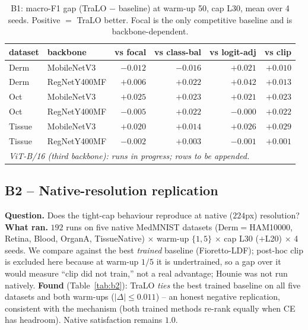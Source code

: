 \documentclass[11pt,a4paper]{article}
\begin{document}
\begin{table}[h]\centering\small
\begin{tabular}{llrrrr}
\toprule
dataset & backbone & vs focal & vs class-bal & vs logit-adj & vs clip \\
\midrule
Derm   & MobileNetV3 & $-0.012$ & $-0.016$ & $+0.021$ & $+0.010$ \\
Derm   & RegNetY400MF & $+0.006$ & $+0.022$ & $+0.042$ & $+0.013$ \\
Oct    & MobileNetV3 & $+0.025$ & $+0.023$ & $+0.021$ & $+0.023$ \\
Oct    & RegNetY400MF & $-0.005$ & $+0.022$ & $-0.000$ & $+0.022$ \\
Tissue & MobileNetV3 & $+0.020$ & $+0.014$ & $+0.026$ & $+0.029$ \\
Tissue & RegNetY400MF & $-0.002$ & $+0.003$ & $-0.001$ & $+0.001$ \\
\midrule
\multicolumn{6}{l}{\itshape ViT-B/16 (third backbone): runs in progress; rows to be appended.} \\
\bottomrule
\end{tabular}
\caption{B1: macro-F1 gap (TraLO $-$ baseline) at warm-up 50, cap L30, mean over 4 seeds. Positive $=$ TraLO
better. Focal is the only competitive baseline and is backbone-dependent.}
\label{tab:b1}
\end{table}

\subsection{B2 -- Native-resolution replication}
\textbf{Question.} Does the tight-cap behaviour reproduce at native ($224$px) resolution? \textbf{What ran.}
$192$ runs on five native MedMNIST datasets (Derm$=$HAM10000, Retina, Blood, OrganA, TissueNative) $\times$
warm-up $\{1,5\}$ $\times$ cap L30 ($+$L20) $\times$ 4 seeds. We compare against the best \emph{trained}
baseline (Fioretto-LDF); post-hoc clip is excluded here because at warm-up $1/5$ it is undertrained, so a gap
over it would measure ``clip did not train,'' not a real advantage; Hounie was not run natively.
\textbf{Found} (Table~\ref{tab:b2}): TraLO \emph{ties} the best trained baseline on all five datasets and both
warm-ups ($|\Delta|\le 0.011$) -- an honest negative replication, consistent with the mechanism (both trained
methods re-rank equally when CE has headroom). Native satisfaction remains $1.0$.
\end{document}
